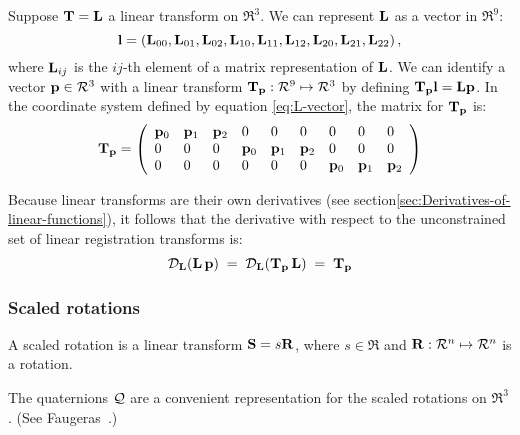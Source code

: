 Suppose ${\mathbf T} = {\mathbf L}$ a linear transform on $\Re^3$.
We can represent ${\mathbf L}$ as a vector in $\Re^9$:
\begin{equation}
\label{eq:L-vector}
{\mathbf l} = \left({\mathbf L}_{00},{\mathbf L}_{01},{\mathbf L}_{02},
       {\mathbf L}_{10},{\mathbf L}_{11},{\mathbf L}_{12},
       {\mathbf L}_{20},{\mathbf L}_{21},{\mathbf L}_{22}\right),
\end{equation}
where ${\mathbf L}_{ij}$ is the $ij$-th element of a
matrix representation of ${\mathbf L}$.
We can identify a vector ${\mathbf p} \in \mathcal{R}^3$
with a linear transform ${\mathbf T}_{{\mathbf p}} : \mathcal{R}^9 \mapsto \mathcal{R}^3$
by defining ${\mathbf T}_{{\mathbf p}}{\mathbf l} = {\mathbf L}{\mathbf p}$.
In the coordinate system defined by equation \ref{eq:L-vector},
the matrix for ${\mathbf T}_{{\mathbf p}}$ is:
\begin{equation}
\label{eq:Tp-matrix}
{\mathbf T}_{{\mathbf p}} =
\left(
\begin{array}{lllllllll}
{\mathbf p}_0 & {\mathbf p}_1 & {\mathbf p}_2 &  0   &  0   &  0   &  0   &  0   &  0 \\
 0   &  0   &  0   & {\mathbf p}_0 & {\mathbf p}_1 & {\mathbf p}_2 &  0   &  0   &  0 \\
 0   &  0   &  0   &  0   &  0   &  0   & {\mathbf p}_0 & {\mathbf p}_1 & {\mathbf p}_2 \\
\end{array}
\right)
\end{equation}

Because linear transforms are their own derivatives
(see section\ref{sec:Derivatives-of-linear-functions}),
it follows that the derivative with respect to the
unconstrained set of linear registration transforms is:
\begin{equation}
\label{eq:linear-transform-derivative}
{\mathcal D}_{{\mathbf L}}{\left( {\mathbf L} \, {\mathbf p} \right)}
 \; = \;
{\mathcal D}_{{\mathbf L}}{\left( {\mathbf T}_{{\mathbf p}} \, {\mathbf L} \right)}
 \; = \;
{\mathbf T}_{{\mathbf p}}
\end{equation}

\subsubsection{Scaled rotations}
\label{sec:Scaled-rotations}

A scaled rotation
is a linear transform ${\mathbf S} = s {\mathbf R}$,
where $s \in \Re$ and ${\mathbf R} : \mathcal{R}^n \mapsto \mathcal{R}^n$
is a rotation.

The quaternions $\mathcal{Q}$ are a convenient representation
for the scaled rotations on $\Re^3$.
(See Faugeras~\cite[sec.~5.5.2]{Faugeras1993}.)

